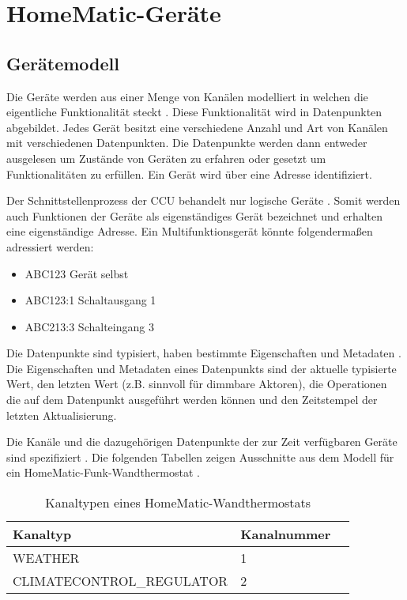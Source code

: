 \section{HomeMatic-Geräte}
\label{ana_hm}

\subsection{Gerätemodell}
\label{ana_hm_modell}
Die Geräte werden aus einer Menge von Kanälen modelliert \cite[Seite 13]{hmscript2} in welchen
die eigentliche Funktionalität steckt \cite[Seite 16]{hmscript2}.
Diese Funktionalität wird in Datenpunkten abgebildet.
Jedes Gerät besitzt eine verschiedene Anzahl und Art von Kanälen mit verschiedenen Datenpunkten.
Die Datenpunkte werden dann entweder ausgelesen um Zustände von Geräten zu erfahren oder gesetzt
um Funktionalitäten zu erfüllen.
Ein Gerät wird über eine Adresse identifiziert.

Der Schnittstellenprozess der CCU behandelt nur logische Geräte \cite{homematic_xmlrpc}.
Somit werden auch Funktionen der Geräte als eigenständiges Gerät bezeichnet und
erhalten eine eigenständige Adresse.
Ein Multifunktionsgerät könnte folgendermaßen adressiert werden:
\begin{itemize}
\item ABC123 Gerät selbst
\item ABC123:1 Schaltausgang 1
\item ABC213:3 Schalteingang 3
\end{itemize}

Die Datenpunkte sind typisiert, haben bestimmte Eigenschaften und Metadaten \cite[Seite 21]{hmscript2}.
Die Eigenschaften und Metadaten eines Datenpunkts sind der aktuelle typisierte Wert, den letzten Wert
(z.B. sinnvoll für dimmbare Aktoren), die Operationen die auf dem Datenpunkt ausgeführt werden können
und den Zeitstempel der letzten Aktualisierung.

Die Kanäle und die dazugehörigen Datenpunkte der zur Zeit verfügbaren Geräte sind
spezifiziert \cite{hmscript4}.
Die folgenden Tabellen zeigen Ausschnitte aus dem Modell für ein
HomeMatic-Funk-Wandthermostat \cite[Seite 12]{hmscript4}.

\begin{table}[h]
\begin{tabular}{|l|l|l|}
\hline
Kanaltyp & Kanalnummer \\
\hline
WEATHER & 1 \\
\hline
CLIMATECONTROL\_REGULATOR & 2 \\
\hline
\end{tabular}
\caption{Kanaltypen eines HomeMatic-Wandthermostats}
\label{tab_hm_chan}
\end{table}

